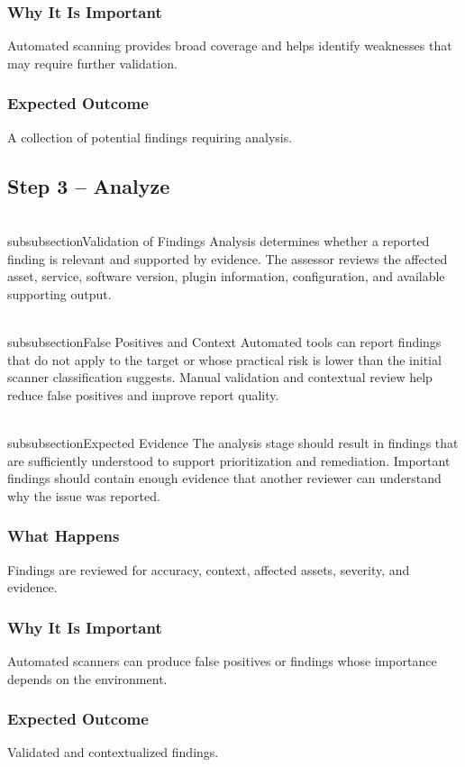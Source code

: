 \documentclass[11pt,a4paper]{article}
\begin{document}
\subsubsection{Why It Is Important}
Automated scanning provides broad coverage and helps identify weaknesses that may require further validation.

\subsubsection{Expected Outcome}
A collection of potential findings requiring analysis.

\subsection{Step 3 – Analyze}
\\subsubsection{Validation of Findings}
Analysis determines whether a reported finding is relevant and supported by evidence. The assessor reviews the affected asset, service, software version, plugin information, configuration, and available supporting output.

\\subsubsection{False Positives and Context}
Automated tools can report findings that do not apply to the target or whose practical risk is lower than the initial scanner classification suggests. Manual validation and contextual review help reduce false positives and improve report quality.

\\subsubsection{Expected Evidence}
The analysis stage should result in findings that are sufficiently understood to support prioritization and remediation. Important findings should contain enough evidence that another reviewer can understand why the issue was reported.

\subsubsection{What Happens}
Findings are reviewed for accuracy, context, affected assets, severity, and evidence.

\subsubsection{Why It Is Important}
Automated scanners can produce false positives or findings whose importance depends on the environment.

\subsubsection{Expected Outcome}
Validated and contextualized findings.
\end{document}
